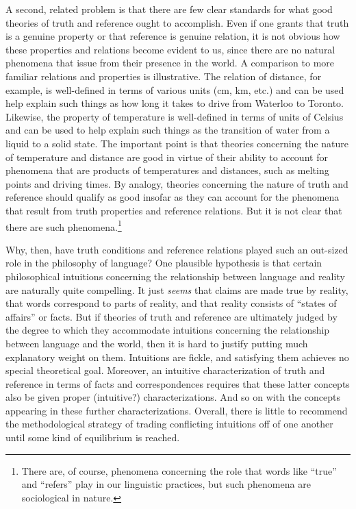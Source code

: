 A second, related problem is that there are few clear standards for what good theories of truth and reference ought to accomplish. Even if one grants that truth is a genuine property or that reference is genuine relation, it is not obvious how these properties and relations become evident to us, since there are no natural phenomena that issue from their presence in the world. A comparison to more familiar relations and properties is illustrative. The relation of distance, for example, is well-defined in terms of various units (cm, km, etc.) and can be used help explain such things as how long it takes to drive from Waterloo to Toronto. Likewise, the property of temperature is well-defined in terms of units of Celsius and can be used to help explain such things as the transition of water from a liquid to a solid state. The important point is that theories concerning the nature of temperature and distance are good in virtue of their ability to account for phenomena that are products of temperatures and distances, such as melting points and driving times. By analogy, theories concerning the nature of truth and reference should qualify as good insofar as they can account for the phenomena that result from truth properties and reference relations. But it is not clear that there are such phenomena.\footnote{There are, of course, phenomena concerning the role that words like ``true'' and ``refers'' play in our linguistic practices, but such phenomena are sociological in nature.}

Why, then, have truth conditions and reference relations played such an out-sized role in the philosophy of language? One plausible hypothesis is that certain philosophical intuitions concerning the relationship between language and reality are naturally quite compelling. It just \textit{seems} that claims are made true by reality, that words correspond to parts of reality, and that reality consists of ``states of affairs'' or facts. But if theories of truth and reference are ultimately judged by the degree to which they accommodate intuitions concerning the relationship between language and the world, then it is hard to justify putting much explanatory weight on them. Intuitions are fickle, and satisfying them achieves no special theoretical goal. Moreover, an intuitive characterization of truth and reference in terms of facts and correspondences requires that these latter concepts also be given proper (intuitive?) characterizations. And so on with the concepts appearing in these further characterizations. Overall, there is little to recommend the methodological strategy of trading conflicting intuitions off of one another until some kind of equilibrium is reached. 

